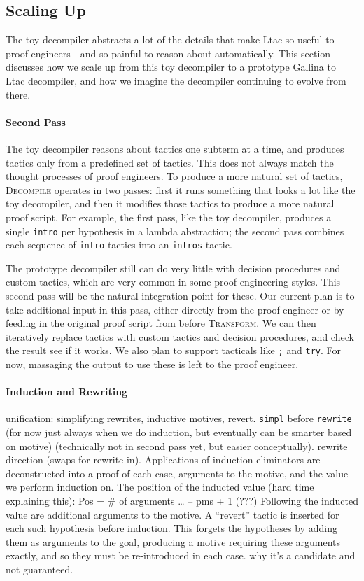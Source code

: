 \subsection{Scaling Up}
\label{sec:second}

The toy decompiler abstracts a lot of the details that make Ltac so useful to proof engineers---and so painful to 
reason about automatically.
This section discusses how we scale up from this toy decompiler to a prototype Gallina to Ltac decompiler,
and how we imagine the decompiler continuing to evolve from there.

\paragraph{Second Pass}
The toy decompiler reasons about tactics one subterm at a time, and produces tactics only from a predefined set of tactics.
This does not always match the thought processes of proof engineers.
To produce a more natural set of tactics, \textsc{Decompile} operates in two passes: first it runs something that looks a lot
like the toy decompiler, and then it modifies those tactics to produce a more natural proof script.
For example, the first pass, like the toy decompiler, produces a single \lstinline{intro} per hypothesis in a lambda abstraction;
the second pass combines each sequence of \lstinline{intro} tactics into an \lstinline{intros} tactic.

The prototype decompiler still can do very little with decision procedures and custom tactics, which are very common
in some proof engineering styles.
This second pass will be the natural integration point for these.
Our current plan is to take additional input in this pass, either directly from the proof engineer
or by feeding in the original proof script from before \textsc{Transform}.
We can then iteratively replace tactics with custom tactics and decision procedures, and check the result see if it works.
We also plan to support tacticals like \lstinline{;} and \lstinline{try}.
For now, massaging the output to use these is left to the proof engineer.

\paragraph{Induction and Rewriting}
unification: simplifying rewrites, inductive motives, revert.
\lstinline{simpl} before \lstinline{rewrite} (for now just always when we do induction, but eventually can be smarter based on motive) (technically not
in second pass yet, but easier conceptually).
rewrite direction (swaps for rewrite in).
Applications of induction eliminators are deconstructed into a proof of each case, arguments to the motive, and the value we perform induction on.
The position of the inducted value (hard time explaining this): Pos = \# of arguments … – pms + 1 (???)
Following the inducted value are additional arguments to the motive. A “revert” tactic is inserted for each such hypothesis before induction. This forgets the hypotheses by adding them as arguments to the goal, producing a motive requiring these arguments exactly, and so they must be re-introduced in each case.
why it's a candidate and not guaranteed.

